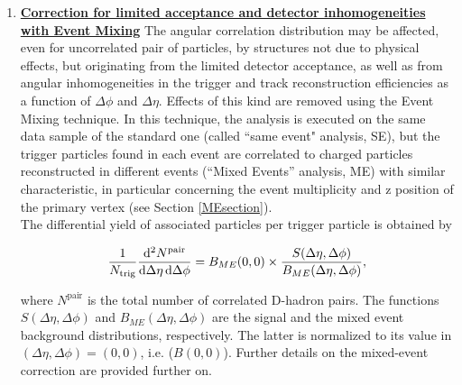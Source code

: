 \begin{enumerate}
\item
\underline{\bf Correction for limited acceptance and detector inhomogeneities with Event Mixing}
The angular correlation distribution may be affected, even for uncorrelated pair of particles, by structures not due to physical effects, but originating from the limited detector acceptance, as well as from angular inhomogeneities in the trigger and track reconstruction efficiencies as a function of $\Delta\phi$ and $\Delta\eta$.
Effects of this kind are removed using the Event Mixing technique.
In this technique, the analysis is executed on the same data sample of the standard one (called ``same event" analysis, SE), but the trigger particles found in each event are correlated to charged particles reconstructed in different events (``Mixed Events'' analysis, ME) with similar characteristic, in particular concerning the event multiplicity and z position of the primary vertex (see Section \ref{MEsection}). \\

The differential yield of associated particles per trigger particle is obtained by
\begin{linenomath}
  \begin{equation}
    \label{2pcorr_incl}
    \frac{1}{N_\text{trig}}\frac{\mathrm{d}^{2}N^\text{pair}}{\mathrm{d}\Delta\eta\, \mathrm{d}\Delta\phi}
= B_{ME}(0,0)\times\frac{S(\Delta\eta,\Delta\phi)}{B_{ME}(\Delta\eta,\Delta\phi)},
\end{equation}
\end{linenomath}
where $N^\text{pair}$ is the total number of correlated D-hadron
pairs. The functions $S(\Delta\eta,\Delta\phi)$ and
$B_{ME}(\Delta\eta,\Delta\phi)$ are the signal and the mixed event
background distributions, respectively. The latter is normalized to its value in
$(\Delta\eta,\Delta\phi)=(0,0)$, i.e. ($B(0,0)$).
Further details on the mixed-event correction are provided further on.


\end{enumerate}

